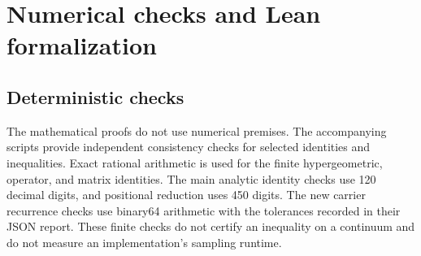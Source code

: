 \section{Numerical checks and Lean formalization}
\label{app:checks}

\subsection{Deterministic checks}

The mathematical proofs do not use numerical premises.
The accompanying scripts provide independent consistency checks
for selected identities and inequalities. Exact rational
arithmetic is used for the finite hypergeometric,
operator, and matrix identities. The main analytic identity checks use
120 decimal digits, and positional reduction uses 450 digits.
The new carrier recurrence checks use binary64 arithmetic with
the tolerances recorded in their JSON report. These finite checks do not certify an inequality on a
continuum and do not measure an implementation's sampling
runtime.

